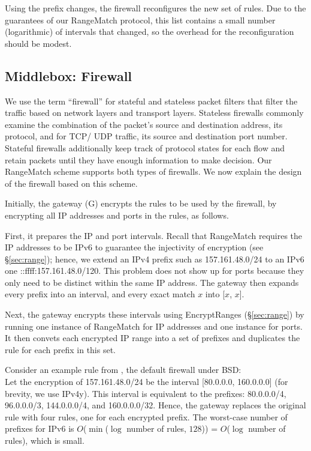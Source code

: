 Using the prefix changes, the firewall 
 reconfigures the new set of rules. Due to the guarantees of our RangeMatch protocol, this list contains a 
small number (logarithmic) of intervals that changed, so the overhead for the reconfiguration should be modest.



\subsection{Middlebox: Firewall}\label{sec:firewall}


We use the term ``firewall'' for stateful and stateless packet filters that filter the traffic based on network layers and transport layers. Stateless firewalls commonly examine the combination of the packet's source and destination address, its protocol, and for TCP/ UDP traffic, its source and destination port number. Stateful firewalls additionally keep track of protocol states for each flow and retain packets until they have enough information to make decision. 
Our RangeMatch scheme supports both types of firewalls. We now explain the design of the firewall based on this scheme.

 Initially, the gateway (G) encrypts the rules to be used by the firewall, by encrypting all IP addresses and ports in the rules, as follows.


First, it prepares the IP and port intervals. Recall that RangeMatch requires the IP addresses to be IPv6 to guarantee the injectivity of encryption (see \S\ref{sec:range}); hence, we extend an IPv4 prefix  such as 157.161.48.0/24 to an IPv6 one  ::ffff:157.161.48.0/120. 
 This problem does not show up for ports because they only need to be distinct within the same IP address.
The gateway then expands every prefix into an interval, and every exact match $x$ into [$x$, $x$]. 

Next, the gateway encrypts these intervals using EncryptRanges (\S\ref{sec:range}) by running one instance of RangeMatch for IP addresses and one instance for ports.
It then convets each encrypted IP range into a set of prefixes and duplicates the rule for each prefix in this set. 

Consider an example rule from  , the 
default firewall under BSD:
  \\ 
Let the encryption of 157.161.48.0/24 be the interval [80.0.0.0, 160.0.0.0] (for brevity, we use IPv4y). 
This interval is equivalent to the prefixes: 80.0.0.0/4, 96.0.0.0/3, 144.0.0.0/4, and 160.0.0.0/32. 
Hence, the gateway replaces the original rule with four rules, one for each encrypted prefix. 
The worst-case number of prefixes for IPv6 is $O$($\min$($\log$ number of rules, $128$)) = $O$($\log$ number of rules), 
which is small. 


